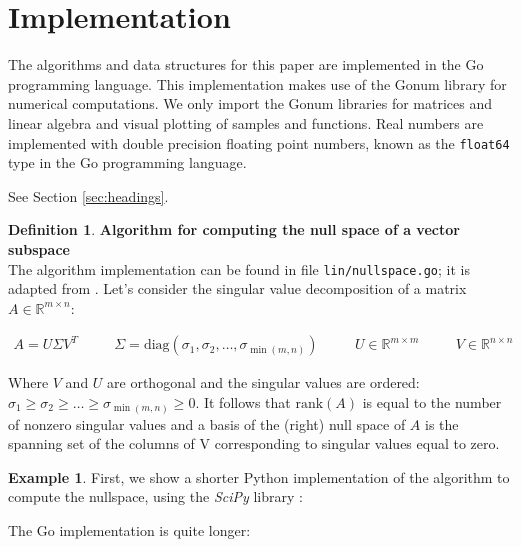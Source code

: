 \documentclass{article}
\theoremstyle{plain}%
\theoremstyle{definition}
\newtheorem{defn}{Definition}[section]
\newtheorem{exmp}{Example}[section]
\theoremstyle{remark}
\def\R{\mathbb{R}}
\newcommand{\diag}[1]{\text{diag}\left(#1\right)}
\newcommand{\mrank}[1]{\text{rank}\left(#1\right)}
\begin{document}
\section{Implementation}
\label{sec:impl}

The algorithms and data structures for this paper are implemented in the Go programming 
language. This implementation makes use of the Gonum library for numerical 
computations. We only import the Gonum libraries for matrices and linear algebra 
and visual plotting of samples and functions.
Real numbers are implemented with double precision floating point numbers,  
known as the \texttt{float64} type in the Go programming language.




See Section \ref{sec:headings}.



\begin{defn}
  \textbf{Algorithm for computing the null space of a vector subspace} \\
  The algorithm implementation can be found in file \texttt{lin/nullspace.go}; it is
  adapted from \cite{scipy/ranknullspace}. 
  Let's consider the singular value decomposition of a matrix $A \in \R^{m \times n}$:

  \begin{equation*}
    \begin{aligned}
      A = U \Sigma V^T & \quad & \Sigma = \diag{\sigma_1, \sigma_2, \hdots, \sigma_{\min(m, n)}  } 
       & \quad &  U \in \R^{m \times m} & \quad & V \in \R^{n \times n}
    \end{aligned}
  \end{equation*}

  Where $V$ and $U$ are orthogonal and the singular values are ordered: $\sigma_1 \geq \sigma_2 \geq \hdots \geq \sigma_{\min(m,n)} \geq 0$.
  It follows that $\mrank{A}$ is equal to the number of nonzero singular values and
  a basis of the (right) null space of $A$ is the spanning set of the columns of V
  corresponding to singular values equal to zero. 
\end{defn}

\begin{exmp}
  First, we show a shorter Python 
  implementation of the algorithm to compute the nullspace, using the 
  \textit{SciPy} library \cite{scipy/ranknullspace}:

  

    The Go implementation is quite longer:

    

\end{exmp}
\end{document}
